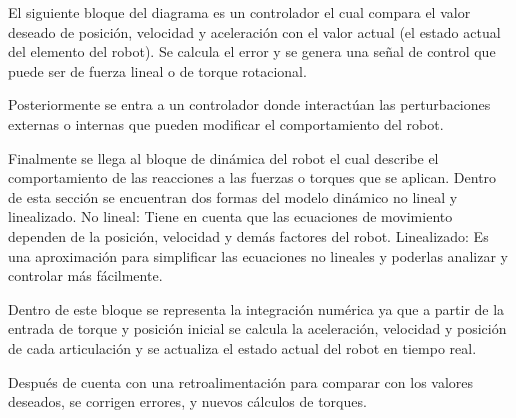El siguiente bloque del diagrama es un controlador el cual compara el valor deseado de posición, velocidad y aceleración con el valor actual (el estado actual del elemento del robot). Se calcula el error y se genera una señal de control que puede ser de fuerza lineal o de torque rotacional. 


Posteriormente se entra a un controlador donde interactúan las perturbaciones externas o internas que pueden modificar el comportamiento del robot. 


Finalmente se llega al bloque de dinámica del robot el cual describe el comportamiento de las reacciones a las fuerzas o torques que se aplican. Dentro de esta sección se encuentran dos formas del modelo dinámico no lineal y linealizado. 
No lineal: Tiene en cuenta que las ecuaciones de movimiento dependen de la posición, velocidad y demás factores del robot. 
Linealizado: Es una aproximación para simplificar las ecuaciones no lineales y poderlas analizar y controlar más fácilmente. 

Dentro de este bloque se representa la integración numérica ya que a partir de la entrada de torque y posición inicial se calcula la aceleración, velocidad y posición de cada articulación y se actualiza el estado actual del robot en tiempo real. 

Después de cuenta con una retroalimentación para comparar con los valores deseados, se corrigen errores,  y nuevos cálculos de torques.


